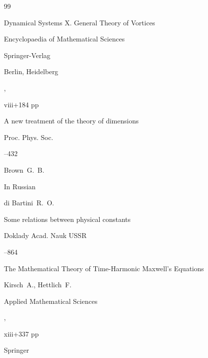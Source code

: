 \begin{thebibliography}{99}

\book    Dynamical Systems X. General Theory of Vortices

\serial  Encyclopaedia of Mathematical Sciences


\publ    Springer-Verlag 

\publaddr Berlin, Heidelberg

,


viii+184 pp






\paper A new treatment of the theory of dimensions 

\jour Proc. Phys. Soc.





--432

\by Brown~G.~B.




\lang In Russian

\by di Bartini~R.~O.

\paper Some relations between physical constants

\jour Doklady Acad. Nauk USSR




--864






\book The Mathematical Theory of Time-Harmonic Maxwell's Equations

\by Kirsch~A., Hettlich~F.

\serial Applied Mathematical Sciences



,


xiii+337 pp

\publ Springer 


\end{thebibliography}
